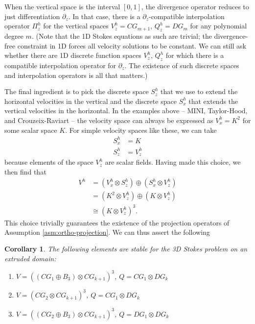 \documentclass{article}
\theoremstyle{definition}
\theoremstyle{plain}
\newtheorem{cor}{Corollary}
\begin{document}
When the vertical space is the interval $[0, 1]$, the divergence operator reduces to just differentiation $\partial_z$.
In that case, there is a $\partial_z$-compatible interpolation operator $\Pi_z^h$ for the vertical spaces $V_z^h = CG_{m + 1}$, $Q_z^h = DG_m$ for any polynomial degree $m$.
(Note that the 1D Stokes equations as such are trivial; the divergence-free constraint in 1D forces all velocity solutions to be constant.
We can still ask whether there are 1D discrete function spaces $V_z^h$, $Q_z^h$ for which there is a compatible interpolation operator for $\partial_z$.
The existence of such discrete spaces and interpolation operators is all that matters.)

The final ingredient is to pick the discrete space $S_z^h$ that we use to extend the horizontal velocities in the vertical and the discrete space $S_x^h$ that extends the vertical velocities in the horizontal.
In the examples above -- MINI, Taylor-Hood, and Crouzeix-Raviart -- the velocity space can always be expressed as $V_x^h = K^2$ for some scalar space $K$.
For simple velocity spaces like these, we can take
\begin{align*}
    S_x^h & = K \\
    S_z^h & = V_z^h
\end{align*}
because elements of the space $V_z^h$ are scalar fields.
Having made this choice, we then find that
\begin{align*}
    V^h & = (V_x^h\otimes S_z^h) \oplus (S_x^h \otimes V_z^h) \\
    & = (K^2\otimes V_z^h) \oplus (K\otimes V_z^h) \\
    & \cong (K \otimes V_z^h)^3.
\end{align*}
This choice trivially guarantees the existence of the projection operators of Assumption \ref{asm:ortho-projection}.
We can thus assert the following
\begin{cor} \label{cor:stable-pairs} The following elements are stable for the 3D Stokes problem on an extruded domain:
    \begin{enumerate}
        \item $V = ((CG_1 \oplus B_3) \otimes CG_{k + 1})^3$, $Q = CG_1\otimes DG_k$ 
        \item $V = (CG_2 \otimes CG_{k + 1})^3$, $Q = CG_1\otimes DG_k$
        \item $V = ((CG_2\oplus B_3) \otimes CG_{k + 1})^3$, $Q = DG_1\otimes DG_k$
    \end{enumerate}
\end{cor}
\end{document}
